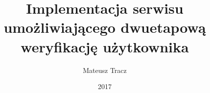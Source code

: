 \documentclass{SGGW-thesis}
\title{Implementacja serwisu umożliwiającego dwuetapową weryfikację użytkownika}
\author{Mateusz Tracz}
\date{2017}
\begin{document}
\maketitle
\statementpage

\tableofcontents







\beforelastpage
\end{document}

